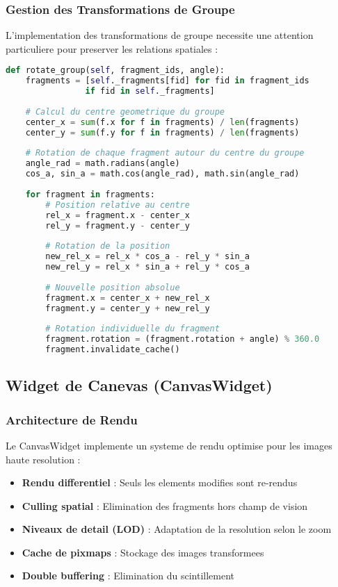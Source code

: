 \documentclass[12pt,a4paper]{article}
\begin{document}
\subsubsection{Gestion des Transformations de Groupe}

L'implementation des transformations de groupe necessite une attention particuliere pour preserver les relations spatiales :

\begin{lstlisting}[language=Python]
def rotate_group(self, fragment_ids, angle):
    fragments = [self._fragments[fid] for fid in fragment_ids 
                if fid in self._fragments]
    
    # Calcul du centre geometrique du groupe
    center_x = sum(f.x for f in fragments) / len(fragments)
    center_y = sum(f.y for f in fragments) / len(fragments)
    
    # Rotation de chaque fragment autour du centre du groupe
    angle_rad = math.radians(angle)
    cos_a, sin_a = math.cos(angle_rad), math.sin(angle_rad)
    
    for fragment in fragments:
        # Position relative au centre
        rel_x = fragment.x - center_x
        rel_y = fragment.y - center_y
        
        # Rotation de la position
        new_rel_x = rel_x * cos_a - rel_y * sin_a
        new_rel_y = rel_x * sin_a + rel_y * cos_a
        
        # Nouvelle position absolue
        fragment.x = center_x + new_rel_x
        fragment.y = center_y + new_rel_y
        
        # Rotation individuelle du fragment
        fragment.rotation = (fragment.rotation + angle) % 360.0
        fragment.invalidate_cache()
\end{lstlisting}

\subsection{Widget de Canevas (CanvasWidget)}

\subsubsection{Architecture de Rendu}

Le CanvasWidget implemente un systeme de rendu optimise pour les images haute resolution :

\begin{itemize}
\item \textbf{Rendu differentiel} : Seuls les elements modifies sont re-rendus
\item \textbf{Culling spatial} : Elimination des fragments hors champ de vision
\item \textbf{Niveaux de detail (LOD)} : Adaptation de la resolution selon le zoom
\item \textbf{Cache de pixmaps} : Stockage des images transformees
\item \textbf{Double buffering} : Elimination du scintillement
\end{itemize}
\end{document}
